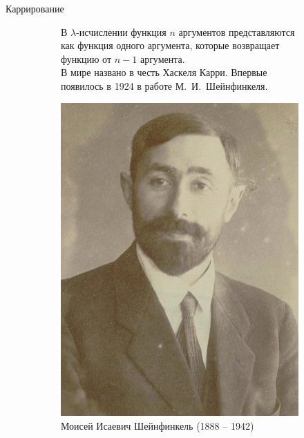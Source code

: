 \begin{frame}{Каррирование%
  }

\begin{figure}[t]
  \begin{subfigure}[t]{0.5\textwidth}
    \vspace{-4em}
В $\lambda$-исчислении функция $n$ аргументов представляются как функция одного аргумента, которые возвращает функцию от $n-1$ аргумента.\\

В мире названо в честь Хаскеля Карри. Впервые появилось в 1924 в работе М.~И.~Шейнфинкеля.\\


  \end{subfigure}
\hspace{1cm}
  \begin{subfigure}[t]{0.3\textwidth}
      \begin{minipage}{1\textwidth}
  \includegraphics[width=1\textwidth]{440px-Moses_Schonfinkel_1922_(cropped).jpg}\\
  Моисей Исаевич Шейнфинкель (1888 -- 1942)
\end{minipage}
  \end{subfigure}
\end{figure}
\end{frame}


